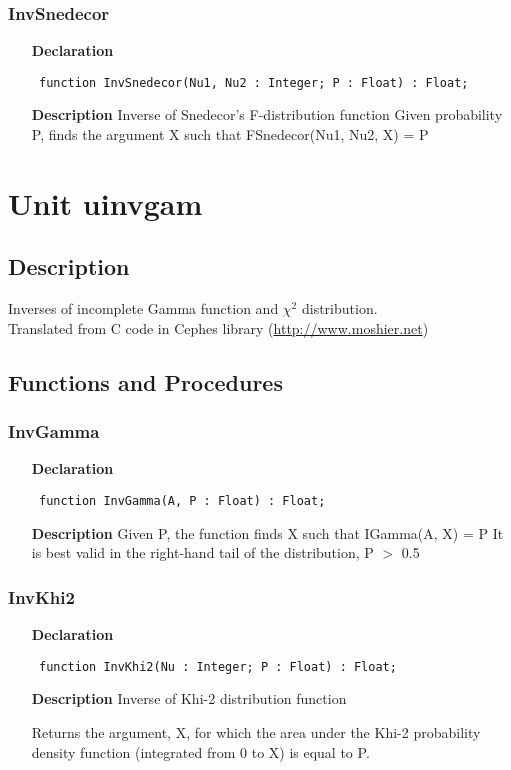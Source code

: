 \documentclass[12pt,a4paper,oneside]{report}
\newcommand{\declarationitem}[1]{\textbf{#1}}
\newcommand{\descriptiontitle}[1]{\textbf{#1}}
\newcommand{\code}[1]{\texttt{#1}}
\begin{document}
\subsubsection{InvSnedecor}
\label{uinvbeta-InvSnedecor}
\begin{itemize}\item[\declarationitem{Declaration}\hfill]
	\begin{flushleft}
		\code{
			function InvSnedecor(Nu1, Nu2 : Integer; P : Float) : Float;}
	\end{flushleft}
	\item[\descriptiontitle{Description}]
	Inverse of Snedecor's F{-}distribution function Given probability P, finds the argument X such that FSnedecor(Nu1, Nu2, X) = P
\end{itemize}
\section{Unit uinvgam}
\label{uinvgam}
\subsection{Description}
Inverses of incomplete Gamma function and $\chi^2$ distribution.\\ Translated from C code in Cephes library (\href{http://www.moshier.net}{http://www.moshier.net}) \subsection{Functions and Procedures}
\subsubsection{InvGamma}
\label{uinvgam-InvGamma}
\begin{itemize}\item[\declarationitem{Declaration}\hfill]
	\begin{flushleft}
		\code{
			function InvGamma(A, P : Float) : Float;}
	\end{flushleft}
	\item[\descriptiontitle{Description}]
	Given P, the function finds X such that IGamma(A, X) = P It is best valid in the right{-}hand tail of the distribution, P {$>$} 0.5
\end{itemize}
\subsubsection{InvKhi2}
\label{uinvgam-InvKhi2}
\begin{itemize}\item[\declarationitem{Declaration}\hfill]
	\begin{flushleft}
		\code{
			function InvKhi2(Nu : Integer; P : Float) : Float;}
	\end{flushleft}
	\item[\descriptiontitle{Description}]
	Inverse of Khi{-}2 distribution function
	
	Returns the argument, X, for which the area under the Khi{-}2 probability density function (integrated from 0 to X) is equal to P.
\end{itemize}
\end{document}

